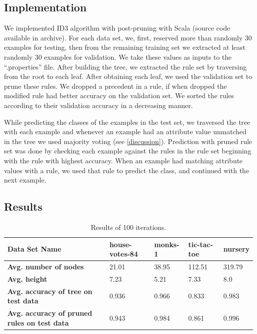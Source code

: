 \documentclass[12pt]{article}
\begin{document}
\subsection{Implementation}
We implemented ID3 algorithm with post-pruning with Scala (source code
available in archive). For each data set, we, first, reserved more than
randomly 30 examples for testing, then from the remaining training set
we extracted at least randomly 30 examples for validation. We take
these values as inputs to the ``.properties'' file. After building the
tree, we extracted the rule set by traversing from the root to each
leaf. After obtaining each leaf, we used the validation set to prune
these rules. We dropped a precedent in a rule, if when dropped the
modified rule had better accuracy on the validation set. We sorted the
rules according to their validation accuracy in a decreasing manner.

While predicting the classes of the examples in the test set, we
traversed the tree with each example and whenever an example had an
attribute value unmatched in the tree we used majority voting (see
\ref{discussion}). Prediction with pruned rule set was done by
checking each example against the rules in the rule set beginning with
the rule with highest accuracy. When an example had matching attribute
values with a rule, we used that rule to predict the class, and
continued with the next example.

\subsection{Results}
\begin{table}[H]
  \centering
  \begin{small}
    \begin{tabular}{|l|l|l|l|l|}
      \hline
      \textbf{Data Set Name}                           & house-votes-84 & monks-1 & tic-tac-toe & nursery \\ \hline
      \textbf{Avg. number of nodes}                           & 21.01                   & 38.95            & 112.51               & 319.79           \\ \hline
      \textbf{Avg. height}                                & 7.23                    & 5.21             & 7.33                 & 8.0                \\ \hline
      \textbf{Avg. accuracy of tree on test data}         & 0.936                   & 0.966            & 0.833                & 0.983            \\ \hline
      \textbf{Avg. accuracy of pruned rules on test data} & 0.943                   & 0.984            & 0.861                & 0.996            \\ \hline
    \end{tabular}
\end{small}
\caption{Results of 100 iterations.}
\label{table:performance}
\end{table}
\end{document}
